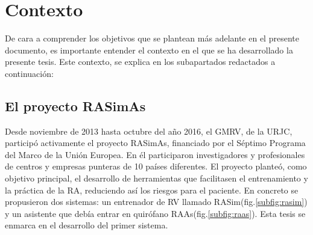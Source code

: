 

\section{Contexto}

De cara a comprender los objetivos que se plantean más adelante en el presente documento, es importante entender el contexto en el que se ha desarrollado la presente tesis. 
Este contexto, se explica en los subapartados redactados a continuación:


\subsection{El proyecto RASimAs}
\label{intro:rasimas}

Desde noviembre de 2013 hasta octubre del año 2016, el \ac{GMRV}, de la \ac{URJC}, participó activamente el proyecto \ac{RASimAs}\cite{rasimasweb}, financiado por el Séptimo Programa del Marco de la Unión Europea. En él participaron investigadores y profesionales de centros y empresas punteras de 10 países diferentes. El proyecto planteó, como objetivo principal, el desarrollo de herramientas que facilitasen el entrenamiento y la práctica de la \ac{RA}, reduciendo así los riesgos para el paciente. En concreto se propusieron dos sistemas: un entrenador de \ac{RV} llamado \ac{RASim}(fig.\ref{subfig:rasim}) y un asistente que debía entrar en quirófano \ac{RAAs}(fig.\ref{subfig:raas}). Esta tesis se enmarca en el desarrollo del primer sistema.

